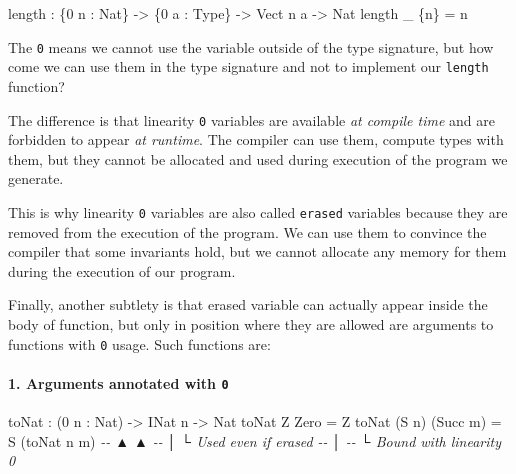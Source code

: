 \documentclass[
]{article}
\newenvironment{Shaded}{}{}
\newcommand{\CommentTok}[1]{\textcolor[rgb]{0.38,0.63,0.69}{\textit{#1}}}
\newcommand{\DataTypeTok}[1]{\textcolor[rgb]{0.56,0.13,0.00}{#1}}
\newcommand{\DecValTok}[1]{\textcolor[rgb]{0.25,0.63,0.44}{#1}}
\newcommand{\FunctionTok}[1]{\textcolor[rgb]{0.02,0.16,0.49}{#1}}
\newcommand{\NormalTok}[1]{#1}
\newcommand{\OperatorTok}[1]{\textcolor[rgb]{0.40,0.40,0.40}{#1}}
\newcommand{\OtherTok}[1]{\textcolor[rgb]{0.00,0.44,0.13}{#1}}
\begin{document}
\begin{Shaded}
\begin{Highlighting}[]
\FunctionTok{length} \OperatorTok{:}\NormalTok{ \{}\DecValTok{0}\NormalTok{ n }\OperatorTok{:} \DataTypeTok{Nat}\NormalTok{\} }\OtherTok{{-}\textgreater{}}\NormalTok{ \{}\DecValTok{0}\NormalTok{ a }\OperatorTok{:} \DataTypeTok{Type}\NormalTok{\} }\OtherTok{{-}\textgreater{}} \DataTypeTok{Vect}\NormalTok{ n a }\OtherTok{{-}\textgreater{}} \DataTypeTok{Nat}
\FunctionTok{length}\NormalTok{ \_ \{n\} }\OtherTok{=}\NormalTok{ n}
\end{Highlighting}
\end{Shaded}

The \texttt{0} means we cannot use the variable outside of the type
signature, but how come we can use them in the type signature and not to
implement our \texttt{length} function?

The difference is that linearity \texttt{0} variables are available
\emph{at compile time} and are forbidden to appear \emph{at runtime}.
The compiler can use them, compute types with them, but they cannot be
allocated and used during execution of the program we generate.

This is why linearity \texttt{0} variables are also called
\texttt{erased} variables because they are removed from the execution of
the program. We can use them to convince the compiler that some
invariants hold, but we cannot allocate any memory for them during the
execution of our program.

Finally, another subtlety is that erased variable can actually appear
inside the body of function, but only in position where they are allowed
are arguments to functions with \texttt{0} usage. Such functions are:

\hypertarget{arguments-annotated-with-0}{%
\paragraph{\texorpdfstring{1. Arguments annotated with
\texttt{0}}{1. Arguments annotated with 0}}\label{arguments-annotated-with-0}}

\begin{Shaded}
\begin{Highlighting}[]
\NormalTok{toNat }\OperatorTok{:}\NormalTok{ (}\DecValTok{0}\NormalTok{ n }\OperatorTok{:} \DataTypeTok{Nat}\NormalTok{) }\OtherTok{{-}\textgreater{}} \DataTypeTok{INat}\NormalTok{ n }\OtherTok{{-}\textgreater{}} \DataTypeTok{Nat}
\NormalTok{toNat }\DataTypeTok{Z} \DataTypeTok{Zero} \OtherTok{=} \DataTypeTok{Z}
\NormalTok{toNat (}\DataTypeTok{S}\NormalTok{ n) (}\DataTypeTok{Succ}\NormalTok{ m) }\OtherTok{=} \DataTypeTok{S}\NormalTok{ (toNat n m)}
\CommentTok{{-}{-}       ▲                      ▲}
\CommentTok{{-}{-}       │                      └ Used even if erased}
\CommentTok{{-}{-}       │}
\CommentTok{{-}{-}       └ Bound with linearity 0}
\end{Highlighting}
\end{Shaded}
\end{document}
